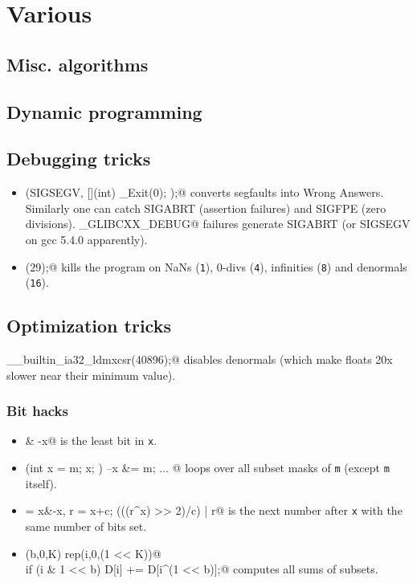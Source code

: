 \chapter{Various}


\section{Misc. algorithms}

\section{Dynamic programming}

\section{Debugging tricks}
	\begin{itemize}
		\item \verb@signal(SIGSEGV, [](int) { _Exit(0); });@ converts segfaults into Wrong Answers.
			Similarly one can catch SIGABRT (assertion failures) and SIGFPE (zero divisions).
			\verb@_GLIBCXX_DEBUG@ failures generate SIGABRT (or SIGSEGV on gcc 5.4.0 apparently).
		\item \verb@feenableexcept(29);@ kills the program on NaNs (\texttt 1), 0-divs (\texttt 4), infinities (\texttt 8) and denormals (\texttt{16}).
	\end{itemize}

\section{Optimization tricks}
	\verb@__builtin_ia32_ldmxcsr(40896);@ disables denormals (which make floats 20x slower near their minimum value).
	\subsection{Bit hacks}
		\begin{itemize}
			\item \verb@x & -x@ is the least bit in \texttt{x}.
			\item \verb@for (int x = m; x; ) { --x &= m; ... }@ loops over all subset masks of \texttt{m} (except \texttt{m} itself).
			\item \verb@c = x&-x, r = x+c; (((r^x) >> 2)/c) | r@ is the next number after \texttt{x} with the same number of bits set.
			\item \verb@rep(b,0,K) rep(i,0,(1 << K))@ \\ \verb@  if (i & 1 << b) D[i] += D[i^(1 << b)];@ computes all sums of subsets.
		\end{itemize}
